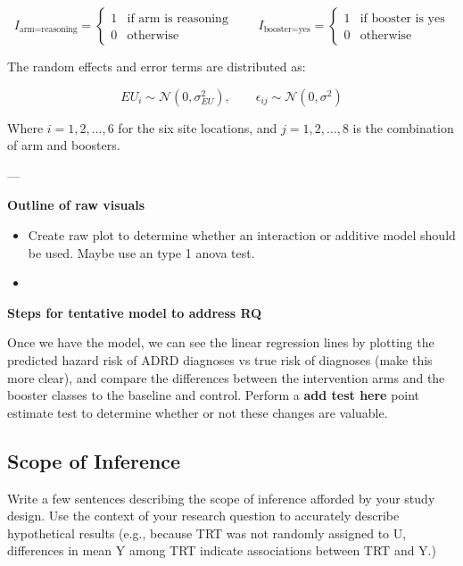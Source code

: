 \documentclass[11pt]{article}
\begin{document}
\begin{equation}
I_{\text{arm=reasoning}} =
\begin{cases}
1 & \text{if arm is reasoning} \\
0 & \text{otherwise}
\end{cases}
\qquad
I_{\text{booster=yes}} =
\begin{cases}
1 & \text{if booster is yes} \\
0 & \text{otherwise}
\end{cases}
\end{equation}

The random effects and error terms are distributed as:

\begin{equation}
EU_{i} \sim \mathcal{N}(0, \sigma^2_{EU}), \qquad \epsilon_{ij} \sim \mathcal{N}(0, \sigma^2)
\end{equation}

Where \(i = 1, 2, \ldots, 6\) for the six site locations, and \(j = 1, 2, \ldots, 8\) is the combination of arm and boosters.



---

\textbf{\textbf{Outline of raw visuals}}
\begin{itemize}
\item Create raw plot to determine whether an interaction or additive model should be used. Maybe use an type 1 anova test.
\item 
\end{itemize}


\textbf{\textbf{Steps for tentative model to address RQ}}

Once we have the model, we can see the linear regression lines by plotting the predicted hazard risk of ADRD diagnoses vs true risk of diagnoses (make this more clear), and compare the differences between the intervention arms and the booster classes to the baseline and control. Perform a \textbf{\textbf{add test here}} point estimate test to determine whether or not these changes are valuable.



\subsection{Scope of Inference}
\label{sec:orgd50c022}

Write a few sentences describing the scope of inference afforded by your study design. Use the context of your research question to accurately describe hypothetical results (e.g., because TRT was not randomly assigned to U, differences in mean Y among TRT indicate associations between TRT and Y.)
\end{document}
